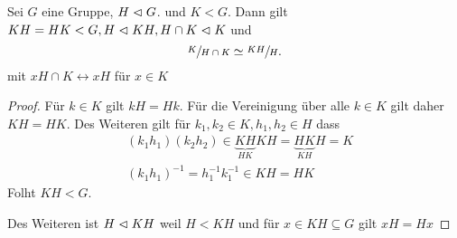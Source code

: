 \begin{corollary}
	Sei $G$ eine Gruppe, $H \vartriangleleft G$. und $K < G$.
	Dann gilt $K H = H K < G, H \vartriangleleft KH, H \cap K \vartriangleleft K $ und 
	\[
	\sfrac{K}{H \cap K} \simeq \sfrac{KH}{H}
	.\] 
	mit $x H \cap K \leftrightarrow x H$ für $x \in K$
\end{corollary}

\begin{proof}
	Für $k \in K$ gilt $kH = Hk$. 
	Für die Vereinigung über alle $k \in K$ gilt daher $KH = HK$.
	Des Weiteren gilt für  $k_1, k_2 \in K, h_1,h_2 \in H$ dass
	\begin{align*}
		&(k_1 h_1) (k_2 h_2) \in \underbrace{KH}_{HK} KH = \underbrace{HK}_{KH} H = K\\
		&(k_1 h_1)^{-1} = h_1^{-1} k_1^{-1} \in KH = HK
	\end{align*}
	Folht $KH < G$.

	Des Weiteren ist $H \vartriangleleft KH$ weil $H < KH$ und für $x \in KH \subseteq G$ gilt $xH = Hx$
\end{proof}























